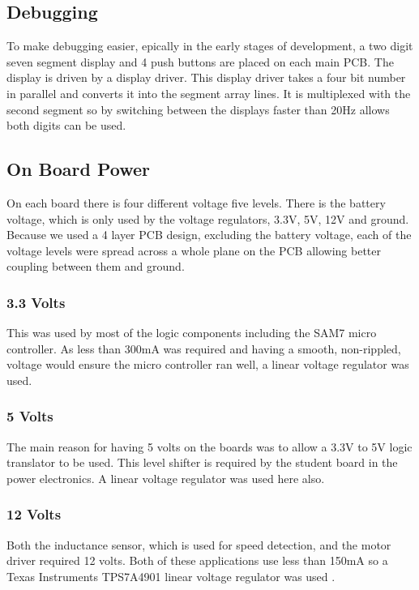   \subsection{Debugging}
  To make debugging easier, epically in the early stages of development, a two
  digit seven segment display and 4 push buttons are placed on each main PCB. The
  display is driven by a display driver. This display driver takes a four bit
  number in parallel and converts it into the segment array lines. It is
  multiplexed with the second segment so by switching between the displays
  faster than 20Hz allows both digits can be used.

  \subsection{On Board Power}
  On each board there is four different voltage five levels. There is the
  battery voltage, which is only used by the voltage regulators, 3.3V, 5V, 12V
  and ground. Because we used a 4 layer PCB design, excluding the battery
  voltage, each of the voltage levels were spread across a whole plane on the
  PCB allowing better coupling between them and ground.

    \subsubsection{3.3 Volts}
    This was used by most of the logic components including the SAM7 micro
    controller. As less than 300mA was required and having a smooth, non-rippled,
    voltage would ensure the micro controller ran well, a linear voltage
    regulator was used.

    \subsubsection{5 Volts}
    The main reason for having 5 volts on the boards was to allow a 3.3V to 5V
    logic translator to be used. This level shifter is required by the student
    board in the power electronics. A linear voltage regulator was used here
    also.

    \subsubsection{12 Volts}
    Both the inductance sensor, which is used for speed detection, and the motor
    driver required 12 volts. Both of these applications use less than 150mA so
    a Texas Instruments TPS7A4901 linear voltage regulator was
    used \cite{TPS7A4901}.

